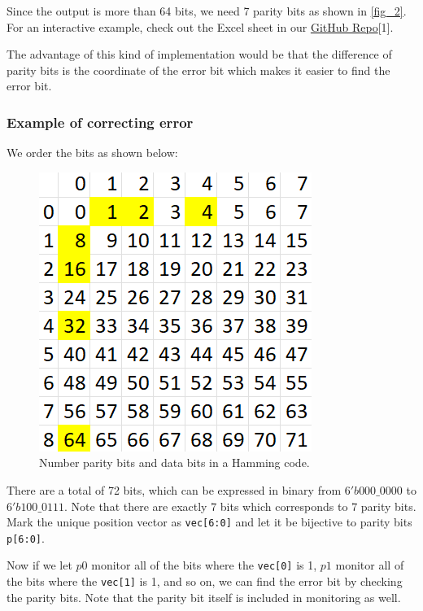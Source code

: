 \documentclass[conference]{IEEEtran}
\begin{document}
Since the output is more than 64 bits, we need 7 parity bits as shown in
\ref{fig_2}. For an interactive example, check out the Excel sheet in our
\href{https://github.com/luckunately/ELEC433-Projects}{GitHub Repo}[1]. %

The advantage of this kind of implementation would be that the difference of
parity bits is the coordinate of the error bit which makes it easier to find
the error bit.

\subsubsection{Example of correcting error}

We order the bits as shown below:

\begin{figure}[htbp]
  \centerline{\includegraphics{Images/Hamming_bits_order.png}}
  \caption{Number parity bits and data bits in a Hamming code.}
  \label{fig_3}
\end{figure}

There are a total of 72 bits, which can be expressed in binary from
$6'b000\_0000$ to $6'b 100\_0111$. Note that there are exactly 7 bits which
corresponds to 7 parity bits. Mark the unique position vector as
\texttt{vec[6:0]} and let it be bijective to parity bits \texttt{p[6:0]}.

Now if we let $p0$ monitor all of the bits where the \texttt{vec[0]} is 1, $p1$
monitor all of the bits where the \texttt{vec[1]} is 1, and so on, we can find
the error bit by checking the parity bits. Note that the parity bit itself is
included in monitoring as well.
\end{document}
